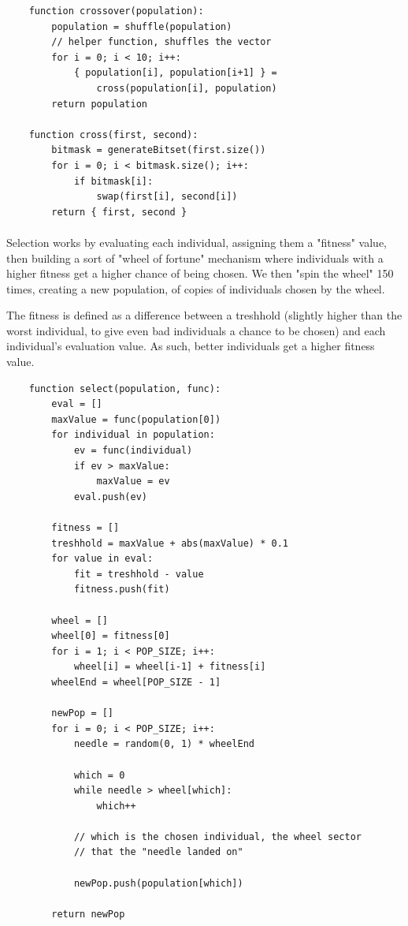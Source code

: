 \documentclass{article}
\begin{document}
    \begin{verbatim}
    function crossover(population):
        population = shuffle(population) 
        // helper function, shuffles the vector
        for i = 0; i < 10; i++:
            { population[i], population[i+1] } = 
                cross(population[i], population)
        return population

    function cross(first, second):
        bitmask = generateBitset(first.size())
        for i = 0; i < bitmask.size(); i++:
            if bitmask[i]:
                swap(first[i], second[i])
        return { first, second }
    \end{verbatim}
    
    \paragraph{}
    Selection works by evaluating each individual, assigning them a "fitness" value, then building a sort of "wheel of fortune" mechanism where individuals with a higher fitness get a higher chance of being chosen. We then "spin the wheel" 150 times, creating a new population, of copies of individuals chosen by the wheel.

    The fitness is defined as a difference between a treshhold (slightly higher than the worst individual, to give even bad individuals a chance to be chosen) and each individual's evaluation value. As such, better individuals get a higher fitness value.

    \begin{verbatim}
    function select(population, func):
        eval = []
        maxValue = func(population[0])
        for individual in population:
            ev = func(individual)
            if ev > maxValue:
                maxValue = ev
            eval.push(ev)

        fitness = []
        treshhold = maxValue + abs(maxValue) * 0.1
        for value in eval:
            fit = treshhold - value
            fitness.push(fit)
        
        wheel = []
        wheel[0] = fitness[0]
        for i = 1; i < POP_SIZE; i++:
            wheel[i] = wheel[i-1] + fitness[i]
        wheelEnd = wheel[POP_SIZE - 1]

        newPop = []
        for i = 0; i < POP_SIZE; i++:
            needle = random(0, 1) * wheelEnd
            
            which = 0
            while needle > wheel[which]:
                which++

            // which is the chosen individual, the wheel sector
            // that the "needle landed on"

            newPop.push(population[which])

        return newPop
    \end{verbatim}
\end{document}
